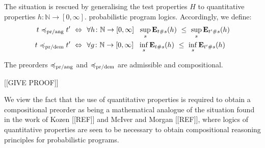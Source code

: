 The situation is rescued by generalising the test properties $H$ to 
quantitative properties $h \colon \mathbb{N} \to [0,\infty]$. probabilistic program logics.
Accordingly, we define:
\begin{align*}
t \preccurlyeq_{\text{pr/ang}} t' ~ \Leftrightarrow ~ ~& \forall h \colon \mathbb{N} \to [0,\infty]~~ \sup_s  \mathbf{E}_{t\#s} (h)~ \leq~ \sup_s \mathbf{E}_{t'\#s} (h)
\\
t \preccurlyeq_{\text{pr/dem}} t' ~ \Leftrightarrow ~ ~& \forall g \colon \mathbb{N} \to [0,\infty]~~ \inf_s  \mathbf{E}_{t\#s} (h)~ \leq~ \inf_s \mathbf{E}_{t'\#s} (h)
\end{align*}
\begin{aproposition}
The preorders $\preccurlyeq_{\text{pr/ang}}$ and $\preccurlyeq_{\text{pr/dem}}$ are admissible and compositional.
\end{aproposition}

[[GIVE PROOF]]

We view the fact that the use of quantitative properties is required to obtain a compositional preorder as being
a mathematical analogue of the situation found in the work of Kozen [[REF]] and McIver and Morgan [[REF]], where 
logics of quantitative properties are seen to be necessary to obtain compositional reasoning principles for 
probabilistic programs.
